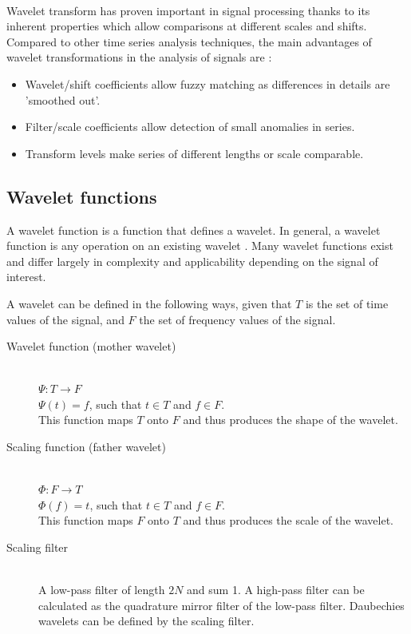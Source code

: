 \paragraph{}
Wavelet transform has proven important in signal processing thanks to its
inherent properties which allow comparisons at different scales and shifts.
Compared to other time series analysis techniques, the main advantages of
wavelet transformations in the analysis of signals are \cite{karus2013}:
\begin{itemize}
	\item Wavelet/shift coefficients allow fuzzy matching as differences in details
	are 'smoothed out'.
	\item Filter/scale coefficients allow detection of small anomalies in series.
	\item Transform levels make series of different lengths or scale comparable.
\end{itemize}

\subsection{Wavelet functions}
A wavelet function is a function that defines a wavelet. In general, a wavelet
function is any operation on an existing wavelet \cite{wadkar}. Many wavelet
functions exist and differ largely in complexity and applicability depending on
the signal of interest.

A wavelet can be defined in the following ways, given that $T$ is the set of
time values of the signal, and $F$ the set of frequency values of the signal.
\begin{description}
	\item[Wavelet function (mother wavelet)] \hfill \\ $\Psi: T \rightarrow
	F$\\ $\Psi(t) = f$, such that $t \in T$ and $f \in F$.\\
	This function maps $T$ onto $F$ and thus produces the shape of the wavelet.

	\item[Scaling function (father wavelet)] \hfill \\ $\Phi: F \rightarrow
	T$\\ $\Phi(f) = t$, such that $t \in T$ and $f \in F$.\\
	This function maps $F$ onto $T$ and thus produces the scale of the wavelet.

	\item[Scaling filter] \hfill \\ A low-pass filter of length $2N$ and sum 1. A
	high-pass filter can be calculated as the quadrature mirror filter of the
	low-pass filter. Daubechies wavelets can be defined by the scaling filter.
\end{description}

